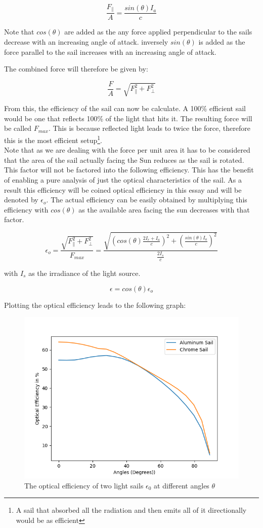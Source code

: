 \documentclass[14pt]{article}
\begin{document}
$$
  \frac{F_{\parallel}}{A} = \frac{ sin(\theta) I_{a} }{c}
$$

Note that $cos(\theta)$ are added as the any force applied perpendicular to the sails
decrease with an increasing angle of attack. inversely $sin(\theta)$ is added as the
force parallel to the sail increases with an increasing angle of attack.
 
The combined force will therefore be given by:

$$
\frac{F}{A} = \sqrt{F_{\parallel}^2 + F_{\perp}^2}
$$

From this, the efficiency of the sail can now be calculate. A 100\% efficient sail
would be one that reflects 100\% of the light that hits it. The resulting force
will be called $F_{max}$. This is because reflected
light leads to twice the force, therefore this is the most efficient setup\footnote{
  A sail that absorbed all the radiation and then emits all of it directionally would 
  be as efficient
}. \\
Note that as we are dealing with the force per unit area it has to be considered that the area
of the sail actually facing the Sun reduces as the sail is rotated. This factor
will not be factored into the following efficiency. This has the benefit of enabling
a pure analysis of just the optical characteristics of the sail. As a result this efficiency
will be coined optical efficiency in this essay and will be denoted by $\epsilon_{o}$.
The actual efficiency can be easily obtained by multiplying this efficiency with $cos(\theta)$ as the
available area facing the sun decreases with that factor.

$$
\epsilon_{o} = \frac{\sqrt{F_{\parallel}^2 + F_{\perp}^2}}{F_{max}} 
= \frac{\sqrt{(cos(\theta) \frac{ 2  I_{r} + I_{a} }{c})^2 + (\frac{ sin(\theta) I_{a} }{c})^2}}{\frac{2 I_s}{c}}
$$

with $I_s$ as the irradiance of the light source.

$$
\epsilon = cos(\theta) \epsilon_{o}
$$

Plotting the optical efficiency leads to the following graph:

\begin{figure}[H]
  \centering
  \includegraphics[width=12cm]{./python/output/optical_efficiency.png}
  \caption{The optical efficiency of two light sails $\epsilon_{0}$ at different angles $\theta$}
  \label{fig:optical_efficiency}
\end{figure}
\end{document}
